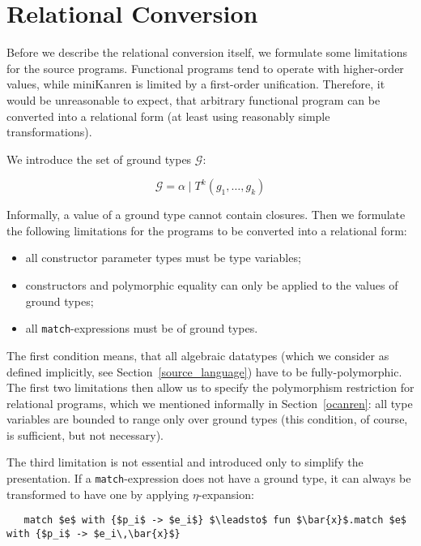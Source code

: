 \section{Relational Conversion}
\label{conversion}
\def\arraystretch{1}

Before we describe the relational conversion itself, we formulate some limitations for the source
programs. Functional programs tend to operate with higher-order values, while miniKanren is
limited by a first-order unification. Therefore, it would be unreasonable to expect, that arbitrary
functional program can be converted into a relational form (at least using reasonably simple 
transformations). 

We introduce the set of ground types $\mathcal G$:

$$
\mathcal G=\alpha \mid T^k(g_1,\dots,g_k)
$$

Informally, a value of a ground type cannot contain closures. Then we formulate the following limitations for
the programs to be converted into a relational form:

\begin{itemize}
  \item all constructor parameter types must be type variables;
  \item constructors and polymorphic equality can only be applied to the values of ground types;
  \item all \lstinline|match|-expressions must be of ground types.
\end{itemize}

The first condition means, that all algebraic datatypes (which we consider as defined implicitly, see Section~\ref{source_language}) 
have to be fully-polymorphic. The first two limitations then allow us to specify the polymorphism restriction for 
relational programs, which we mentioned informally in Section~\ref{ocanren}: all type variables are bounded to
range only over ground types (this condition, of course, is sufficient, but not necessary).

The third limitation is not essential and introduced only to simplify the presentation. If a \lstinline|match|-expression does not
have a ground type, it can always be transformed to have one by applying $\eta$-expansion:

\begin{lstlisting}
   match $e$ with {$p_i$ -> $e_i$} $\leadsto$ fun $\bar{x}$.match $e$ with {$p_i$ -> $e_i\,\bar{x}$}
\end{lstlisting}

